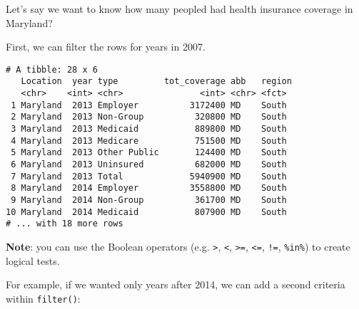 \documentclass[]{article}
\newenvironment{Shaded}{\begin{snugshade}}{\end{snugshade}}
\newcommand{\DecValTok}[1]{\textcolor[rgb]{0.00,0.00,0.81}{#1}}
\newcommand{\KeywordTok}[1]{\textcolor[rgb]{0.13,0.29,0.53}{\textbf{#1}}}
\newcommand{\NormalTok}[1]{#1}
\newcommand{\OperatorTok}[1]{\textcolor[rgb]{0.81,0.36,0.00}{\textbf{#1}}}
\newcommand{\StringTok}[1]{\textcolor[rgb]{0.31,0.60,0.02}{#1}}
\begin{document}
Let's say we want to know how many peopled had health insurance coverage
in Maryland?

First, we can filter the rows for years in 2007.

\begin{Shaded}
\end{Shaded}

\begin{verbatim}
# A tibble: 28 x 6
   Location  year type         tot_coverage abb   region
   <chr>    <int> <chr>               <int> <chr> <fct> 
 1 Maryland  2013 Employer          3172400 MD    South 
 2 Maryland  2013 Non-Group          320800 MD    South 
 3 Maryland  2013 Medicaid           889800 MD    South 
 4 Maryland  2013 Medicare           751500 MD    South 
 5 Maryland  2013 Other Public       124400 MD    South 
 6 Maryland  2013 Uninsured          682000 MD    South 
 7 Maryland  2013 Total             5940900 MD    South 
 8 Maryland  2014 Employer          3558800 MD    South 
 9 Maryland  2014 Non-Group          361700 MD    South 
10 Maryland  2014 Medicaid           807900 MD    South 
# ... with 18 more rows
\end{verbatim}

\textbf{Note}: you can use the Boolean operators (e.g.
\texttt{\textgreater{}}, \texttt{\textless{}}, \texttt{\textgreater{}=},
\texttt{\textless{}=}, \texttt{!=}, \texttt{\%in\%}) to create logical
tests.

For example, if we wanted only years after 2014, we can add a second
criteria within \texttt{filter()}:

\begin{Shaded}
\end{Shaded}
\end{document}
